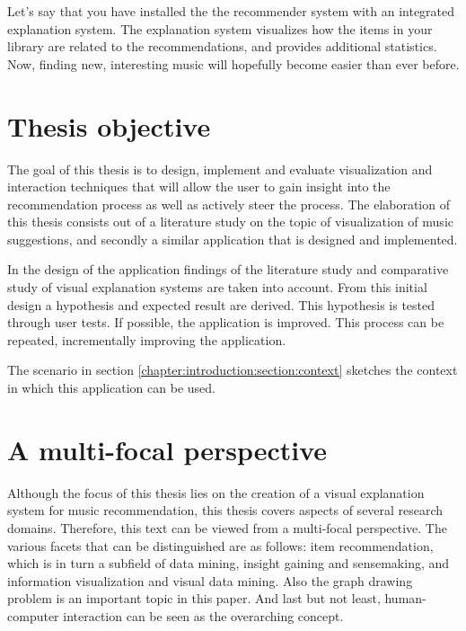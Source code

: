 Let's say that you have installed the the recommender system with an integrated explanation system. The explanation system visualizes how the items in your library are related to the recommendations, and provides additional statistics. Now, finding new, interesting music will hopefully become easier than ever before.

\section{Thesis objective}\label{chapter:introduction:section:objective}

The goal of this thesis is to design, implement and evaluate visualization and interaction techniques that will allow the user to gain insight into the recommendation process as well as actively steer the process. The elaboration of this thesis consists out of a literature study on the topic of visualization of music suggestions, and secondly a similar application that is designed and implemented\cite{kuleuven:2008:t313}.

In the design of the application findings of the literature study and comparative study of visual explanation systems are taken into account. From this initial design a hypothesis and expected result are derived. This hypothesis is tested through user tests. If possible, the application is improved. This process can be repeated, incrementally improving the application.

The scenario in section \ref{chapter:introduction:section:context} sketches the context in which this application can be used.


\section{A multi-focal perspective}\label{chapter:introduction:section:perspective}

Although the focus of this thesis lies on the creation of a visual explanation system for music recommendation, this thesis covers aspects of several research domains. Therefore, this text can be viewed from a multi-focal perspective. The various facets that can be distinguished are as follows: item recommendation, which is in turn a subfield of data mining, insight gaining and sensemaking, and information visualization and visual data mining. Also the graph drawing problem is an important topic in this paper. And last but not least, human-computer interaction can be seen as the overarching concept.

